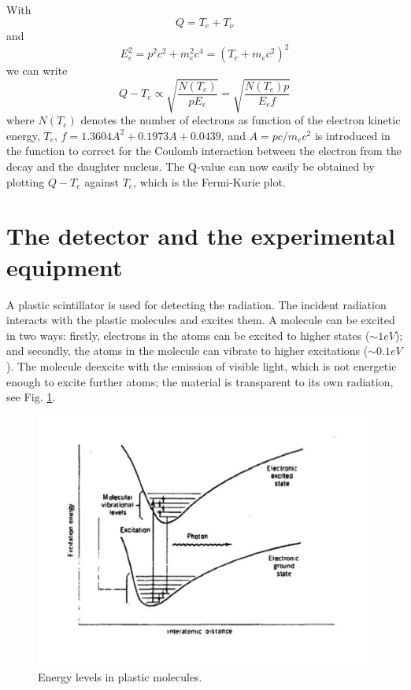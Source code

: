 \documentclass[a4,11pt, notitlepage]{article}
\begin{document}
With
\begin{equation}
Q=T_e + T_{\nu}
\end{equation} 
and
\begin{equation}
E_e^2 = p^2c^2+m_e^2c^4=(T_e+m_ec^2)^2
\end{equation} 
we can write
\begin{equation}
Q-T_e \propto \sqrt{\frac{N(T_e)}{pE_e}} = \sqrt{\frac{N(T_e)p}{E_ef}}
\label{eq:f}
\end{equation}
where $N(T_e)$ denotes the number of electrons as function of the
electron kinetic energy, $T_e$, $f=1.3604A^2+0.1973A+0.0439$, and $A=pc/m_ec^2$ is introduced in the function to correct for the Coulomb interaction between the electron from the decay and the daughter nucleus. 
The Q-value can now easily be obtained by plotting $Q-T_e$ against $T_e$, which is the Fermi-Kurie plot.



\section{The detector and the experimental equipment}

A plastic scintillator is used for detecting the radiation. The incident radiation interacts with the plastic molecules and excites them. A molecule can be excited in two ways: firstly, electrons in the atoms can be excited to higher states ($\sim 1 eV$); and secondly, the atoms in the molecule can vibrate to higher excitations ($\sim 0.1 eV$). The molecule deexcite with the emission of visible light, which is not energetic enough to excite further atoms; the material is transparent to its own radiation, see Fig. \ref{fig:mol}. 

\vspace{-40pt}
\begin{figure}[htp]
  \vspace{40pt}
  \begin{center}
    \includegraphics[width=15.0cm]{figures/Energy.png}
    \caption{Energy levels in plastic molecules.} %
\label{fig:mol}
  \end{center}
\end{figure}
\end{document}
